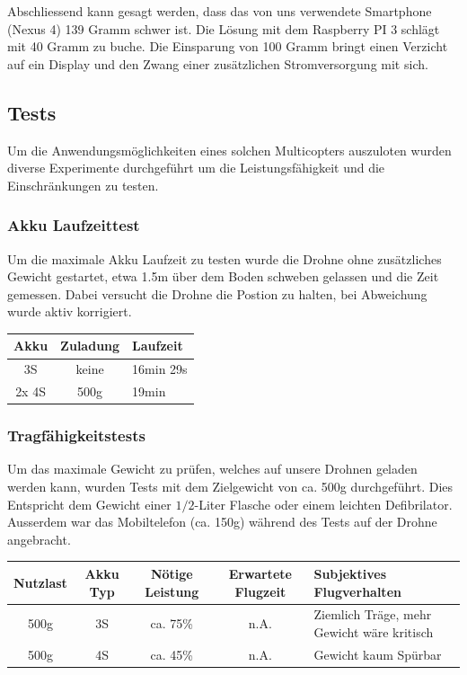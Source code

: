 Abschliessend kann gesagt werden, dass das von uns verwendete Smartphone (Nexus 4) 139 Gramm schwer ist. Die Lösung mit dem Raspberry PI 3 schlägt mit 40 Gramm zu buche. Die Einsparung von 100 Gramm bringt einen Verzicht auf ein Display und den Zwang einer zusätzlichen Stromversorgung mit sich.



\newpage
\subsection{Tests}
Um die Anwendungsmöglichkeiten eines solchen Multicopters auszuloten wurden diverse Experimente durchgeführt um die Leistungsfähigkeit und die Einschränkungen zu testen. 

\subsubsection{Akku Laufzeittest}
Um die maximale Akku Laufzeit zu testen wurde die Drohne ohne zusätzliches Gewicht gestartet, etwa 1.5m über dem Boden schweben gelassen und die Zeit gemessen. Dabei versucht die Drohne die Postion zu halten, bei Abweichung wurde aktiv korrigiert. \\

\begin{tabularx}{\textwidth}{|c|c|X|}
\hline
\textbf{Akku} & \textbf{Zuladung} & \textbf{Laufzeit} \\ \hline \hline 
3S & keine & 16min 29s\\ \hline 
2x 4S & 500g & 19min\\ \hline 
\end{tabularx}


\subsubsection{Tragfähigkeitstests}
Um das maximale Gewicht zu prüfen, welches auf unsere Drohnen geladen werden kann, wurden Tests mit dem Zielgewicht von ca. 500g durchgeführt. Dies Entspricht dem Gewicht einer $1/2$-Liter Flasche oder einem leichten Defibrilator. Ausserdem war das Mobiltelefon (ca. 150g) während des Tests auf der Drohne angebracht.  \\

\begin{tabularx}{\textwidth}{|c|c|c|c|X|}
\hline
\textbf{Nutzlast} & \textbf{Akku Typ} & \textbf{Nötige Leistung }& \textbf{Erwartete Flugzeit } & \textbf{Subjektives Flugverhalten }\\
\hline \hline
500g & 3S & ca. 75\%  & n.A. & Ziemlich Träge, mehr Gewicht wäre kritisch\\\hline
500g & 4S & ca. 45\%  & n.A. & Gewicht kaum Spürbar\\
\hline
\end{tabularx}\\

